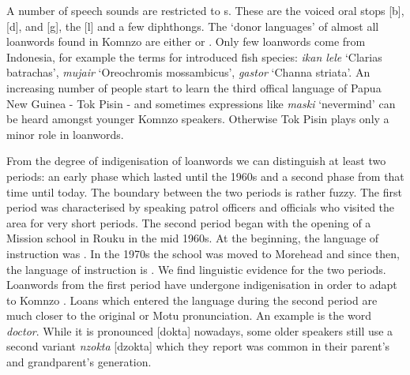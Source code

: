 A number of speech sounds are restricted to s. These are the voiced oral stops [b], [d], and [g], the   [l] and a few diphthongs. The `donor languages' of almost all loanwords found in Komnzo are either  or . Only few loanwords come from  Indonesia, for example the terms for introduced fish species: \emph{ikan lele} `Clarias batrachas', \emph{mujair} `Oreochromis mossambicus', \emph{gastor} `Channa striata'. An increasing number of people start to learn the third offical language of Papua New Guinea - Tok Pisin - and sometimes expressions like \emph{maski} `nevermind' can be heard amongst younger Komnzo speakers. Otherwise Tok Pisin plays only a minor role in loanwords.%

From the degree of indigenisation of loanwords we can distinguish at least two periods: an early phase which lasted until the 1960s and a second phase from that time until today. The boundary between the two periods is rather fuzzy. The first period was characterised by  speaking patrol officers and officials who visited the area for very short periods. The second period began with the opening of a Mission school in Rouku in the mid 1960s. At the beginning, the language of instruction was . In the 1970s the school was moved to Morehead and since then, the language of instruction is . We find linguistic evidence for the two periods. Loanwords from the first period have undergone indigenisation in order to adapt to Komnzo . Loans which entered the language during the second period are much closer to the original  or Motu pronunciation. An example is the word \emph{doctor}. While it is pronounced [dokta] nowadays, some older speakers still use a second variant \emph{nzokta} [dzokta] which they report was common in their parent's and grandparent's generation.%


